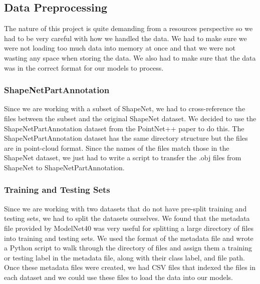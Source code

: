 \documentclass[conference]{IEEEtran}
\begin{document}
\subsection{Data Preprocessing}
The nature of this project is quite demanding from a resources perspective so we had to be very careful with how we handled the data. We had to make sure we were not loading too much data into memory at once and that we were not wasting any space when storing the data. We also had to make sure that the data was in the correct format for our models to process.

\subsubsection{ShapeNetPartAnnotation}
Since we are working with a subset of ShapeNet, we had to cross-reference the files between the subset and the original ShapeNet dataset. We decided to use the ShapeNetPartAnnotation dataset from the PointNet++ paper to do this. The ShapeNetPartAnnotation dataset has the same directory structure but the files are in point-cloud format. Since the names of the files match those in the ShapeNet dataset, we just had to write a script to transfer the .obj files from ShapeNet to ShapeNetPartAnnotation.

\subsubsection{Training and Testing Sets}
Since we are working with two datasets that do not have pre-split training and testing sets, we had to split the datasets ourselves. We found that the metadata file provided by ModelNet40 was very useful for splitting a large directory of files into training and testing sets. We used the format of the metadata file and wrote a Python script to walk through the directory of files and assign them a training or testing label in the metadata file, along with their class label, and file path. Once these metadata files were created, we had CSV files that indexed the files in each dataset and we could use these files to load the data into our models.
\end{document}
